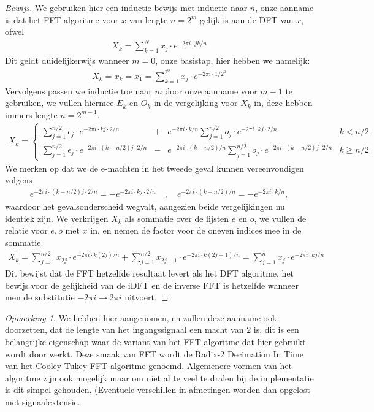 \documentclass[11pt]{amsart}
\newcommand{\e}{\epsilon}
\theoremstyle{remark}
\newtheorem*{opmerk}{Opmerking}
\newcommand{\eq}[1]{\begin{eqnarray*} #1 \end{eqnarray*}}
\begin{document}
\begin{proof}[Bewijs]
We gebruiken hier een inductie bewijs met inductie naar $n$, onze aanname is dat het FFT algoritme voor $x$ van lengte $n=2^m$ gelijk is aan de DFT van $x$, ofwel
\eq{
  X_k = \sum^{N}_{k=1} x_j \cdot e^{-2\pi i \cdot jk/n}
}
Dit geldt duidelijkerwijs wanneer $m=0$, onze basistap, hier hebben we namelijk:
\eq{
  X_k = x_k = x_1 = \sum^{2^0}_{k=1} x_j \cdot e^{-2\pi i \cdot 1/2^0}
}
Vervolgens passen we inductie toe naar $m$ door onze aanname voor $m-1$ te gebruiken,
we vullen hiermee $E_k$ en $O_k$ in de vergelijking voor $X_k$ in, deze hebben immers lengte $n=2^{m-1}$.
\eq{
  X_k = \left\{\begin{array}{llll}
    \sum^{n/2}_{j=1} \e_j \cdot e^{-2\pi i \cdot kj \cdot 2/n} &+& 
    e^{-2\pi i \cdot k/n}
    \sum^{n/2}_{j=1} o_j \cdot e^{-2\pi i\cdot kj \cdot 2/n} &  k< n/2 \\
    \sum^{n/2}_{j=1} \e_j \cdot e^{-2\pi i\cdot (k-n/2) j\cdot 2/n} &-& 
    e^{-2\pi i\cdot (k-n/2)/n}
    \sum^{n/2}_{j=1} o_j \cdot e^{-2\pi i\cdot (k-n/2)j\cdot 2/n} &  k\geq n/2 
  \end{array}\right.
}
We merken op dat we de e-machten in het tweede geval kunnen vereenvoudigen volgens
\eq{
  e^{-2\pi i\cdot (k-n/2)j \cdot 2/n} 
  = - e^{-2\pi i\cdot kj\cdot 2/n} \quad,\quad e^{-2\pi i\cdot(k-n/2)/n} 
= -e^{-2\pi i\cdot k/n},
}
waardoor het gevalsonderscheid wegvalt, aangezien beide vergelijkingen nu identiek zijn.
We verkrijgen $X_k$ als sommatie over de lijsten $e$ en $o$, we vullen de relatie voor $e,o$ met $x$ in, en nemen de factor voor de oneven indices mee in de sommatie.
\eq{
  X_k = \sum^{n/2}_{j=1} x_{2j} \cdot e^{-2\pi i\cdot k (2j)/n} + 
    \sum^{n/2}_{j=1} x_{2j+1} \cdot e^{-2\pi i\cdot k (2j+1)/n} 
    = \sum^n_{j=1} x_j \cdot e^{-2\pi i\cdot k j/n}
}
Dit bewijst dat de FFT hetzelfde resultaat levert als het DFT algoritme, het bewijs voor de gelijkheid van de iDFT en de inverse FFT is 
hetzelfde wanneer men de substitutie $-2\pi i \rightarrow 2\pi i$ uitvoert.
\end{proof}

\begin{opmerk}
We hebben hier aangenomen, en zullen deze aanname ook doorzetten, dat de lengte van het ingangssignaal een macht van $2$ is, dit is een belangrijke
eigenschap waar de variant van het FFT algoritme dat hier gebruikt wordt door werkt. Deze smaak van FFT wordt
de Radix-2 Decimation In Time van het Cooley-Tukey FFT algoritme genoemd. Algemenere vormen van het algoritme
zijn ook mogelijk maar om niet al te veel te dralen bij de implementatie is dit simpel gehouden.
(Eventuele verschillen in afmetingen worden dan opgelost met signaalextensie.
\end{opmerk}
\end{document}
